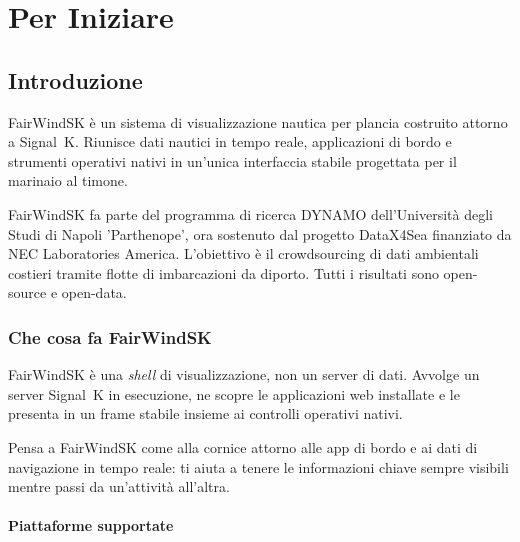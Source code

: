 \part{Per Iniziare}

\chapter{Introduzione}

FairWindSK è un sistema di visualizzazione nautica per plancia costruito attorno a Signal~K.
Riunisce dati nautici in tempo reale, applicazioni di bordo e strumenti operativi nativi
in un'unica interfaccia stabile progettata per il marinaio al timone.

\begin{notebox}
FairWindSK fa parte del programma di ricerca DYNAMO dell'Università degli Studi di Napoli
'Parthenope', ora sostenuto dal progetto DataX4Sea finanziato da NEC Laboratories America.
L'obiettivo è il crowdsourcing di dati ambientali costieri tramite flotte di imbarcazioni da diporto.
Tutti i risultati sono open-source e open-data.
\end{notebox}

\section{Che cosa fa FairWindSK}

FairWindSK è una \emph{shell} di visualizzazione, non un server di dati.
Avvolge un server Signal~K in esecuzione, ne scopre le applicazioni web installate e le
presenta in un frame stabile insieme ai controlli operativi nativi.

Pensa a FairWindSK come alla cornice attorno alle app di bordo e ai dati di navigazione
in tempo reale: ti aiuta a tenere le informazioni chiave sempre visibili mentre passi
da un'attività all'altra.

\subsection{Piattaforme supportate}

